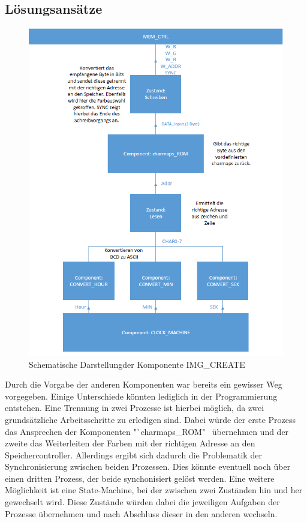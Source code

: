 \documentclass[12pt,a4paper,bibliography=totoc,listof=totoc]{scrartcl}
\begin{document}
\subsection{Lösungsansätze}
\begin{figure}[htbp]
	\centering
	\includegraphics[scale = 0.45]{pics/blockdiagramm}
	\caption{Schematische Darstellungder Komponente IMG\_CREATE}
	\label{blockdiagramm}
\end{figure}
Durch die Vorgabe der anderen Komponenten war bereits ein gewisser Weg vorgegeben. Einige Unterschiede könnten lediglich in der Programmierung 
entstehen. Eine Trennung in zwei Prozesse ist hierbei möglich, da zwei grundsätzliche Arbeitsschritte zu erledigen sind. Dabei würde der erste 
Prozess das Ansprechen der Komponenten "`charmaps\_ROM" \, 
übernehmen und der zweite das Weiterleiten der Farben mit der 
richtigen Adresse an den Speichercontroller. Allerdings ergibt sich dadurch die Problematik der Synchronisierung zwischen beiden Prozessen. Dies 
könnte eventuell noch über einen dritten Prozess, 
der beide synchonisiert gelöst werden. 
Eine weitere Möglichkeit ist eine State-Machine, bei der zwischen zwei Zuständen hin und her gewechselt wird. Diese Zustände würden dabei die 
jeweiligen Aufgaben der Prozesse übernehmen und nach Abschluss dieser in den anderen wechseln.
\end{document}

